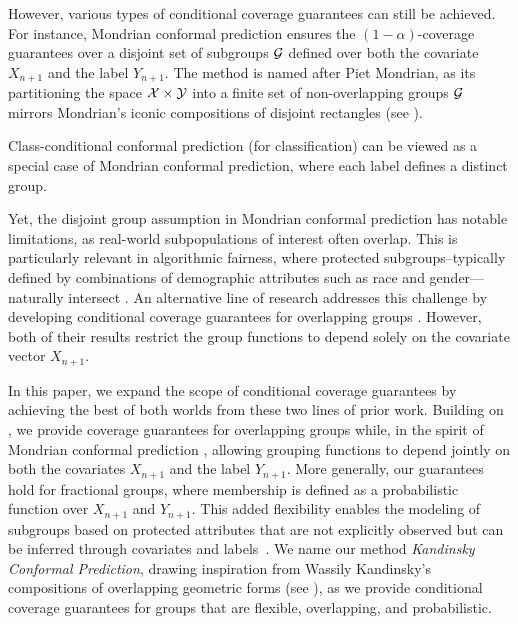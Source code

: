However, various types of conditional coverage guarantees can still be achieved. For instance, Mondrian conformal prediction \citep{VLNG03} ensures the $(1-\alpha)$-coverage guarantees over a disjoint set of subgroups $\cal G$ defined over both the covariate $X_{n+1}$ and the label $Y_{n+1}$. The method is named after Piet Mondrian, as its partitioning the space $\cal X \times \cal Y$ into a finite set of non-overlapping groups ${\cal G}$ mirrors Mondrian’s iconic compositions of disjoint rectangles (see ). 
\iffalse 
Within each group, the coverage guarantee holds: for every group \( G \in \calG \),
\begin{equation}
    \label{eq:groupcond_guarantee}
    \mathbb P_{(X_{n+1}, Y_{n+1}) \sim \cal D} \left[ Y_{n+1} \in \calC(X_{n+1}) \mid (X_{n+1},Y_{n+1}) \in G\right] = 1-\alpha.
\end{equation}
\fi
Class-conditional conformal prediction (for classification) \citep{LBLJ15, DABJT23} can be viewed as a special case of Mondrian conformal prediction, where each label defines a distinct group.

Yet, the disjoint group assumption in Mondrian conformal prediction has notable limitations, as real-world subpopulations of interest often overlap. This is particularly relevant in algorithmic fairness, where protected subgroups--typically defined by combinations of demographic attributes such as race and gender---naturally intersect \citep{kearns18a,HKRR18}. An alternative line of research addresses this challenge by developing conditional coverage guarantees for overlapping groups \citep{JNRR2023, GCC2023}. However, both of their results restrict the group functions to depend solely on the covariate vector $X_{n+1}$.




In this paper, we expand the scope of conditional coverage guarantees by achieving the best of both worlds from these two lines of prior work. Building on \citet{GCC2023, JNRR2023}, we provide coverage guarantees for overlapping groups while, in the spirit of Mondrian conformal prediction \citep{VLNG03}, allowing grouping functions to depend jointly on both the covariates $X_{n+1}$  and the label  $Y_{n+1}$. More generally, our guarantees hold for fractional groups, where membership is defined as a probabilistic function over  $X_{n+1}$ and  $Y_{n+1}$. This added flexibility enables the modeling of subgroups based on protected attributes that are not explicitly observed but can be inferred through covariates and labels~\citep{RBSC20}. We name our method \emph{Kandinsky Conformal Prediction}, drawing inspiration from Wassily Kandinsky’s compositions of overlapping geometric forms (see ), as we provide conditional coverage guarantees for groups that are flexible, overlapping, and probabilistic.



